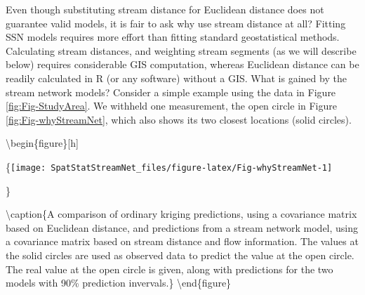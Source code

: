 \documentclass[]{book}
\theoremstyle{definition}
\theoremstyle{definition}
\theoremstyle{definition}
\theoremstyle{remark}
\begin{document}
Even though substituting stream distance for Euclidean distance does not
guarantee valid models, it is fair to ask why use stream distance at
all? Fitting SSN models requires more effort than fitting standard
geostatistical methods. Calculating stream distances, and weighting
stream segments (as we will describe below) requires considerable GIS
computation, whereas Euclidean distance can be readily calculated in R
(or any software) without a GIS. What is gained by the stream network
models? Consider a simple example using the data in Figure
\ref{fig:Fig-StudyArea}. We withheld one measurement, the open circle in
Figure \ref{fig:Fig-whyStreamNet}, which also shows its two closest
locations (solid circles).

\textbackslash{}begin\{figure\}{[}h{]}

\{\centering \texttt{[image: SpatStatStreamNet\_files/figure-latex/Fig-whyStreamNet-1]}

\}

\textbackslash{}caption\{A comparison of ordinary kriging predictions,
using a covariance matrix based on Euclidean distance, and predictions
from a stream network model, using a covariance matrix based on stream
distance and flow information. The values at the solid circles are used
as observed data to predict the value at the open circle. The real value
at the open circle is given, along with predictions for the two models
with 90\% prediction invervals.\}\label{fig:Fig-whyStreamNet}
\textbackslash{}end\{figure\}
\end{document}

